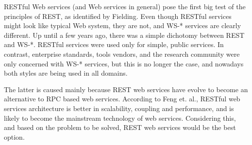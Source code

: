 RESTful Web services (and Web services in general) pose the first big test of the principles of REST, as identified by Fielding. Even though RESTful services might look like typical Web system, they are not, and WS-* services are clearly different. Up until a few years ago, there was a simple dichotomy between REST and WS-*. RESTful services were used only for simple, public services. In contrast, enterprise standards, tools vendors, and the research community were only concerned with WS-* services, but this is no longer the case, and nowadays both styles are being used in all domains.

The latter is caused mainly because REST web services have evolve to become an alternative to RPC based web services. According to Feng et. al.\cite{Feng:2009}, RESTful web services architecture is better in scalability, coupling and performance, and is likely to become the mainstream technology of web services. Considering this, and based on the problem to be solved, REST web services would be the best option.